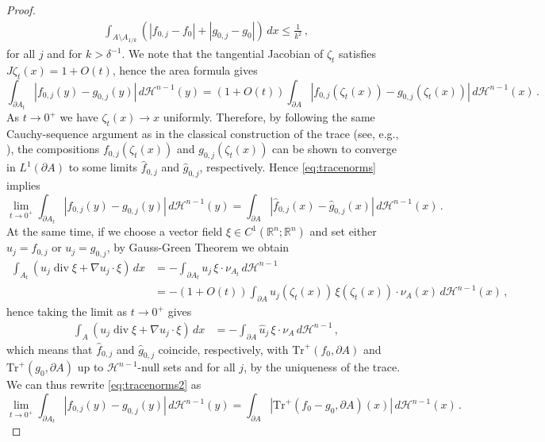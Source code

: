 \documentclass[a4paper,reqno,11pt]{amsart}
\newcommand{\R}{\mathbb{R}}
\newcommand{\Hau}{{\mathcal H}} %
\newcommand{\de}{\partial}
\renewcommand{\div}{\mathop{\mathrm{div}}}
\newcommand{\Tr}{{\mathrm{Tr}}}
\begin{document}
\begin{proof}
\begin{align}\label{eq:precoarea1}
\int_{A\setminus A_{1/k}} (|f_{0,j} - f_{0}|+|g_{0,j} - g_{0}|)\, dx \le \frac{1}{k^{2}}\,,
\end{align}
for all $j$ and for $k> \delta^{-1}$.
We note that the tangential Jacobian of $\zeta_{t}$ satisfies $J\zeta_{t}(x) = 1 + O(t)$, hence the area formula gives
\begin{equation}\label{eq:tracenorms}
\int_{\de A_{t}} |f_{0,j}(y) - g_{0,j}(y)|\, d\Hau^{n-1}(y) = (1+ O(t))\int_{\de A}|f_{0,j}(\zeta_{t}(x)) - g_{0,j}(\zeta_{t}(x))|\, d\Hau^{n-1}(x)\,.
\end{equation}
As $t\to 0^{+}$ we have $\zeta_{t}(x) \to x$ uniformly. Therefore, by following the same Cauchy-sequence argument as in the classical construction of the trace (see, e.g., \cite{EvansGariepy2015}), the compositions $f_{0,j}(\zeta_{t}(x))$ and $g_{0,j}(\zeta_{t}(x))$ can be shown to converge in $L^{1}(\de A)$ to some limits $\hat{f}_{0,j}$ and $\hat{g}_{0,j}$, respectively. Hence \eqref{eq:tracenorms} implies
\begin{equation}\label{eq:tracenorms2}
\lim_{t\to 0^{+}} \int_{\de A_{t}} |f_{0,j}(y) - g_{0,j}(y)|\, d\Hau^{n-1}(y) = 
\int_{\de A}|\hat{f}_{0,j}(x) - \hat{g}_{0,j}(x)|\, d\Hau^{n-1}(x)\,.
\end{equation}
At the same time, if we choose a vector field $\xi\in C^{1}(\R^{n};\R^{n})$ and set either $u_{j}=f_{0,j}$ or $u_{j}=g_{0,j}$, by Gauss-Green Theorem we obtain 
\begin{align*}
\int_{A_{t}} (u_{j}\div \xi + \nabla u_{j}\cdot \xi)\, dx &= -\int_{\de A_{t}} u_{j}\,\xi\cdot \nu_{A_{t}}\, d\Hau^{n-1}\\
&= -(1+O(t))\int_{\de A} u_{j}(\zeta_{t}(x))\,\xi(\zeta_{t}(x))\cdot \nu_{A}(x)\, d\Hau^{n-1}(x)\,, 
\end{align*}
hence taking the limit as $t\to 0^{+}$ gives
\begin{align*}
\int_{A} (u_{j}\div \xi + \nabla u_{j}\cdot \xi)\, dx &= -\int_{\de A} \hat{u}_{j}\,\xi\cdot \nu_{A}\, d\Hau^{n-1}\,, 
\end{align*}
which means that $\hat{f}_{0,j}$ and $\hat{g}_{0,j}$ coincide, respectively, with $\Tr^{+}(f_{0},\de A)$ and $\Tr^{+}(g_{0},\de A)$ up to $\Hau^{n-1}$-null sets and for all $j$, by the uniqueness of the trace. We can thus rewrite \eqref{eq:tracenorms2} as
\begin{equation}\label{eq:tracenorms3}
\lim_{t\to 0^{+}} \int_{\de A_{t}} |f_{0,j}(y) - g_{0,j}(y)|\, d\Hau^{n-1}(y) = 
\int_{\de A}|\Tr^{+}(f_{0}-g_{0},\de A)(x)|\, d\Hau^{n-1}(x)\,.

\end{equation}
\end{proof}
\end{document}
